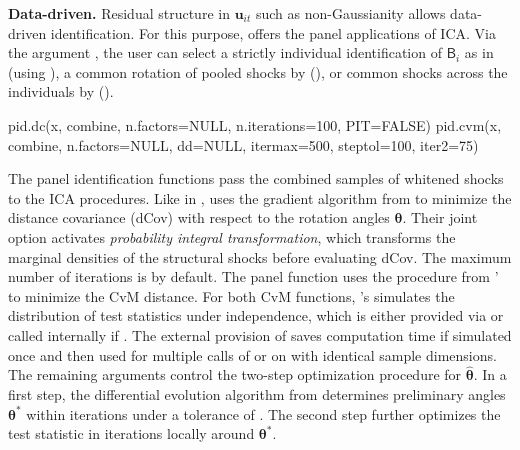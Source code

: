 \textbf{Data-driven.} Residual structure in $ \boldsymbol{u}_{it} $ such as non-Gaussianity allows data-driven identification. For this purpose,  offers the panel applications of ICA. Via the argument , the user can select a strictly individual identification of $ \mathsf{B}_i $ as in  (using ), a common rotation of pooled shocks by \citet{HerwartzWang2024} (), or  common shocks across the individuals by \citet{CalhounEtAl2001} (). 
\begin{CodeChunk}
\begin{CodeInput}
pid.dc(x,  combine, n.factors=NULL, n.iterations=100, PIT=FALSE)
pid.cvm(x, combine, n.factors=NULL, dd=NULL, itermax=500, steptol=100, iter2=75)
\end{CodeInput}
\end{CodeChunk}
The panel identification functions pass the combined samples of whitened shocks to the ICA procedures. Like  in ,  uses the gradient algorithm from  to minimize the distance covariance (dCov) with respect to the rotation angles $ \boldsymbol{\theta} $. Their joint option  activates \textit{probability integral transformation}, which transforms the marginal densities of the structural shocks before evaluating dCov. The maximum number of iterations is  by default. The panel function  uses the procedure from '  to minimize the CvM distance. For both CvM functions, 's \citep{KojadinovicYan2010}  simulates the distribution of test statistics under independence, which is either provided via  or called internally if . The external provision of  saves computation time if simulated once and then used for multiple calls of  or  on  with identical sample dimensions. The remaining arguments control the two-step optimization procedure for $ \boldsymbol{\widehat{\theta}} $. In a first step, the differential evolution algorithm from  \citep{MullenEtAl2011} determines preliminary angles $ \boldsymbol{{\theta}^*} $ within  iterations under a tolerance of . The second step further optimizes the test statistic in  iterations locally around $ \boldsymbol{{\theta}^*} $.


